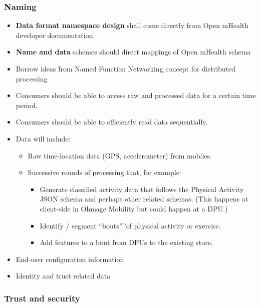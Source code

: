 \subsubsection{Naming} 
\begin{itemize}
\item \textbf{Data format namespace design} shall come directly from Open mHealth developer documentation. 
\item \textbf{Name and data} schemes should direct mappings of Open mHealth schema
\item Borrow ideas from Named Function Networking concept for distributed processing
\item Consumers should be able to access raw and processed data for a certain time period.
\item Consumers should be able to efficiently read data sequentially. 
\item Data will include:
    \begin{itemize}
    \item Raw time-location data (GPS, accelerometer) from mobiles. 
    \item Successive rounds of processing that, for example:  
        \begin{itemize}
        \item Generate classified activity data that follows the Physical Activity JSON schema and perhaps other related schemas.  (This happens at client-side in Ohmage Mobility but could happen at a DPU.)	
        \item Identify / segment ``bouts”''of physical activity or exercise. 
        \item Add features to a bout from DPUs to the existing store. 
        \end{itemize}
    \end{itemize}
    \item End-user configuration information
    \item Identity and trust related data
\end{itemize} 

\subsubsection{Trust and security}

